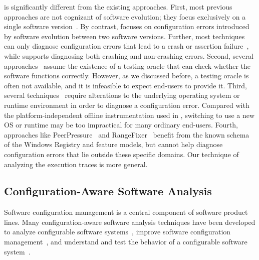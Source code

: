 \ourtool is significantly different from the existing approaches.
First, most previous approaches are not cognizant of software evolution;
they focus exclusively on a single software
version~\cite{Attariyan:2008:UCD, Whitaker:2004:CDS, 
Attariyan:2010:ACT, Rabkin:2011:PPC}. By contrast, \ourtool focuses
on configuration errors introduced by software evolution between
two software versions. Further, most techniques
can only diagnose configuration errors that lead to a crash or
assertion failure~\cite{Attariyan:2008:UCD, Whitaker:2004:CDS, 
Attariyan:2010:ACT, Rabkin:2011:PPC}, while \ourtool supports diagnosing both
crashing and non-crashing errors.
Second, several approaches~\cite{Attariyan:2010:ACT, Whitaker:2004:CDS}
assume the existence of a testing oracle that can 
check whether the software functions correctly. However, as we discussed
before, a testing oracle is often not available, and it
is infeasible to expect end-users to provide it.
Third, several techniques~\cite{Whitaker:2004:CDS, Su:2007:AIC} require alterations
to the underlying operating system or runtime environment
in order to diagnose a configuration error. Compared with
the platform-independent offline instrumentation used
in \ourtool, switching to use a new OS or runtime may be
too impractical for many ordinary end-users.
Fourth, approaches like
PeerPressure~\cite{Wang:2004:AMT} and RangeFixer~\cite{rangefix}
benefit from the known schema of the Windows Registry and
feature models, but cannot help diagnose configuration errors
that lie outside these specific domains. Our technique
of analyzing the execution traces is more general.


\subsection{Configuration-Aware Software Analysis}

Software configuration management is a central component
of software product lines.
Many configuration-aware software analysis techniques
have been developed to analyze configurable software
systems~\cite{Bodden:2013:SLS, Kang:2005:FRL, Mende:2008:SGM,
Kruger:2005:SAE}, improve software configuration
management~\cite{Garvin:2011, Rabiser:2012:QSU, Cooray:2010:RRD,
Barreiros:2009:MRC, TerBeek:2011:GCE}, and understand and test
the behavior of a configurable software
system~\cite{Qu:2008:CRT, SPLAT, Apel:2009:FLA, Shang:2013:ADB,
Staats:2011:PTO}.

